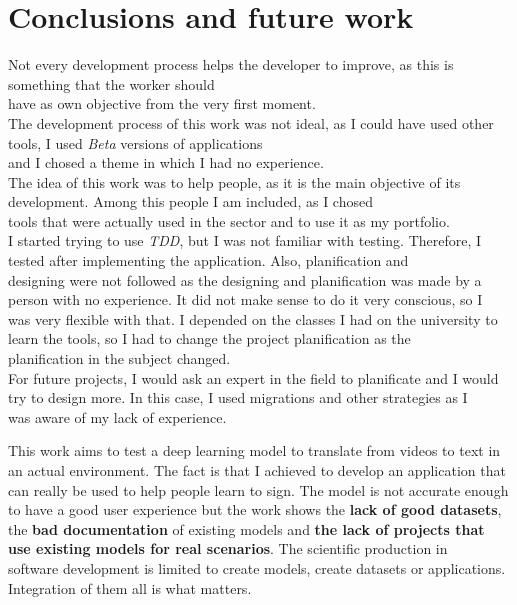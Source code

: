 \chapter{Conclusions and future work}

Not every development process helps the developer to improve, as this is something that the worker should \\
have as own objective from the very first moment. \\

The development process of this work was not ideal, as I could have used other tools, I used \textit{Beta} versions of applications \\
and I chosed a theme in which I had no experience. \\

The idea of this work was to help people, as it is the main objective of its development. Among this people I am included, as I chosed \\
tools that were actually used in the sector and to use it as my portfolio. \\
I started trying to use \textit{TDD}, but I was not familiar with testing. Therefore, I tested after implementing the application. Also, planification and \\
designing were not followed as the designing and planification was made by a person with no experience. It did not make sense to do it very conscious, so I \\
was very flexible with that. I depended on the classes I had on the university to learn the tools, so I had to change the project planification as the \\
planification in the subject changed. \\

For future projects, I would ask an expert in the field to planificate and I would try to design more. In this case, I used migrations and other strategies as I \\
was aware of my lack of experience.

This work aims to test a deep learning model to translate from videos to text in an actual environment. The fact is that I achieved to develop an application that \\
can really be used to help people learn to sign. The model is not accurate enough to have a good user experience but the work shows the \textbf{lack of good datasets}, \\
the \textbf{bad documentation} of existing models and \textbf{the lack of projects that use existing models for real scenarios}. The scientific production in \\
software development is limited to create models, create datasets or applications. Integration of them all is what matters.

